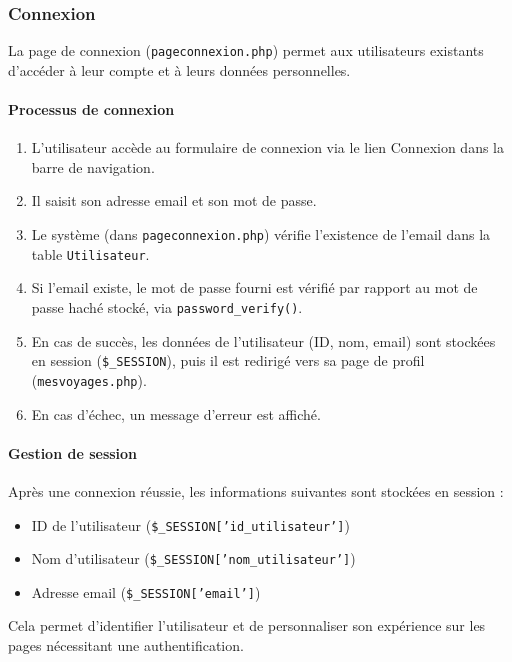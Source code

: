 \documentclass[a4paper,12pt]{article}
\begin{document}
\subsubsection{Connexion}

La page de connexion (\texttt{pageconnexion.php}) permet aux utilisateurs existants d'accéder à leur compte et à leurs données personnelles.

\paragraph{Processus de connexion}

\begin{enumerate}
  \item L'utilisateur accède au formulaire de connexion via le lien \og Connexion \fg{} dans la barre de navigation.
  \item Il saisit son adresse email et son mot de passe.
  \item Le système (dans \texttt{pageconnexion.php}) vérifie l'existence de l'email dans la table \texttt{Utilisateur}.
  \item Si l'email existe, le mot de passe fourni est vérifié par rapport au mot de passe haché stocké, via \texttt{password\_verify()}.
  \item En cas de succès, les données de l’utilisateur (ID, nom, email) sont stockées en session (\texttt{\$\_SESSION}), puis il est redirigé vers sa page de profil (\texttt{mesvoyages.php}).
  \item En cas d’échec, un message d’erreur est affiché.
\end{enumerate}

\paragraph{Gestion de session}

Après une connexion réussie, les informations suivantes sont stockées en session :
\begin{itemize}
  \item ID de l'utilisateur (\texttt{\$\_SESSION['id\_utilisateur']})
  \item Nom d'utilisateur (\texttt{\$\_SESSION['nom\_utilisateur']})
  \item Adresse email (\texttt{\$\_SESSION['email']})
\end{itemize}

Cela permet d’identifier l’utilisateur et de personnaliser son expérience sur les pages nécessitant une authentification.
\end{document}
